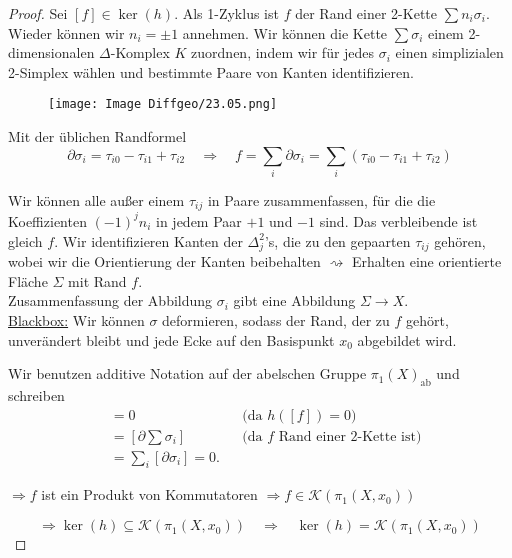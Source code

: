 \documentclass[fleqn, 12pt, letterpaper]{article}
\begin{document}
\begin{proof}
Sei $[f] \in \ker(h)$. Als 1-Zyklus ist $f$ der Rand einer 2-Kette $\sum n_i \sigma_i$. Wieder können wir $n_i = \pm 1$ annehmen. 
Wir können die Kette $\sum \sigma_i$ einem 2-dimensionalen $\Delta$-Komplex $K$ zuordnen, indem wir für jedes $\sigma_i$ einen simplizialen 2-Simplex wählen und bestimmte Paare von Kanten identifizieren.

\begin{figure}[H]
    \centering
    \texttt{[image: Image Diffgeo/23.05.png]}
 \end{figure}

Mit der üblichen Randformel
\[
\partial \sigma_i = \tau_{i0} - \tau_{i1} + \tau_{i2}
\quad \Rightarrow \quad
f = \sum_i \partial \sigma_i = \sum_i (\tau_{i0} - \tau_{i1} + \tau_{i2})
\]

Wir können alle außer einem $\tau_{ij}$ in Paare zusammenfassen, für die die Koeffizienten $(-1)^{j} n_i$ in jedem Paar $+1$ und $-1$ sind. Das verbleibende ist gleich $f$. Wir identifizieren Kanten der $\Delta^2_j$'s, die zu den gepaarten $\tau_{ij}$ gehören, wobei wir die Orientierung der Kanten beibehalten $\rightsquigarrow$ Erhalten eine orientierte Fläche $\Sigma$ mit Rand $f$.\\

Zusammenfassung der Abbildung $\sigma_i$ gibt eine Abbildung $\Sigma \to X$.\\

\underline{Blackbox:} Wir können $\sigma$ deformieren, sodass der Rand, der zu $f$ gehört, unverändert bleibt und jede Ecke auf den Basispunkt $x_0$ abgebildet wird.

\medskip

Wir benutzen additive Notation auf der abelschen Gruppe $\pi_1(X)_{\text{ab}}$ und schreiben
\begin{align*}
  [f] &= 0 && \text{(da $h([f]) = 0$)} \\
      &= \left[ \partial \sum \sigma_i \right] && \text{(da $f$ Rand einer 2-Kette ist)} \\
      &= \sum_i [\partial \sigma_i] = 0.
\end{align*}

$\Rightarrow f$ ist ein Produkt von Kommutatoren $\Rightarrow f \in \mathcal{K}(\pi_1(X,x_0))$

\[
\Rightarrow \ker(h) \subseteq \mathcal{K}(\pi_1(X,x_0))
\quad \Rightarrow \quad \ker(h) = \mathcal{K}(\pi_1(X,x_0))
\]
\end{proof}

\end{document}
